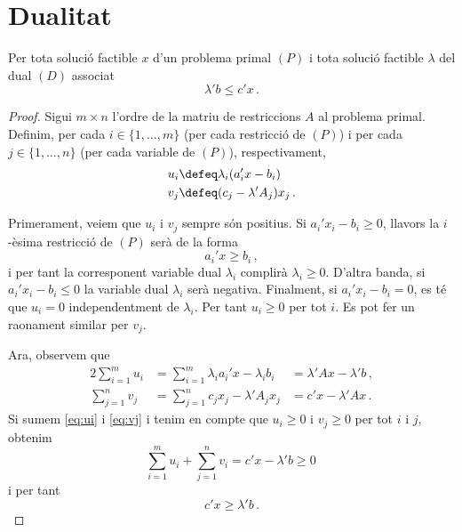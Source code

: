 \chapter{Dualitat}

\begin{teo}\label{teo:dualitat-feble}
    Per tota solució factible $x$ d'un problema primal $\left(P\right)$ i tota solució factible $\lambda$ del dual $\left(D\right)$ associat
    \[ \lambda'b\leq c'x\,. \]
    \begin{proof}
    	Sigui $m\times n$ l'ordre de la matriu de restriccions $A$ al problema primal. Definim, per cada $i\in\{1,\ldots,m\}$ (per cada restricció de $(P)$) i per cada $j\in\{1,\ldots,n\}$ (per cada variable de $(P)$), respectivament, 
    	\begin{align*}
    		u_i &\defeq \lambda_i(a_i'x-b_i)\\
    		v_j &\defeq (c_j - \lambda'A_j)x_j\,.
    	\end{align*}
    	
    	Primerament, veiem que $u_i$ i $v_j$ sempre són positius. Si $a_i'x_i-b_i \ge 0$, llavors la $i$-èsima restricció de $(P)$ serà de la forma \[a_i'x \ge b_i\,,\] i per tant la corresponent variable dual $\lambda_i$ complirà $\lambda_i \ge 0$. D'altra banda, si $a_i'x_i-b_i \le 0$ la variable dual $\lambda_i$ serà negativa. Finalment, si $a_i'x_i-b_i = 0$, es té que $u_i = 0$ independentment de $\lambda_i$. Per tant $u_i \ge 0$ per tot $i$. Es pot fer un raonament similar per $v_j$.
    	
    	Ara, observem que
    	\begin{alignat}{2}{}
    		\sum_{i = 1}^{m} u_i &= \sum_{i = 1}^{m} \lambda_ia_i'x-\lambda_ib_i &= \lambda'Ax - \lambda'b\,, \label{eq:ui}\\
    		\sum_{j = 1}^{n} v_j &= \sum_{j = 1}^{n} c_jx_j - \lambda'A_jx_j &= c'x - \lambda'Ax\,. \label{eq:vj}
    	\end{alignat}
    	Si sumem \eqref{eq:ui} i \eqref{eq:vj} i tenim en compte que $u_i \ge 0$ i $v_j \ge 0$ per tot $i$ i $j$, obtenim
    	\begin{equation}\label{eq:sum-ui-vj}
    		\sum_{i = 1}^{m} u_i + \sum_{j = 1}^{n} v_i= c'x-\lambda'b \ge 0\,
    	\end{equation}
    	i per tant \[c'x \ge \lambda'b\,.\]
    \end{proof}
\end{teo}
